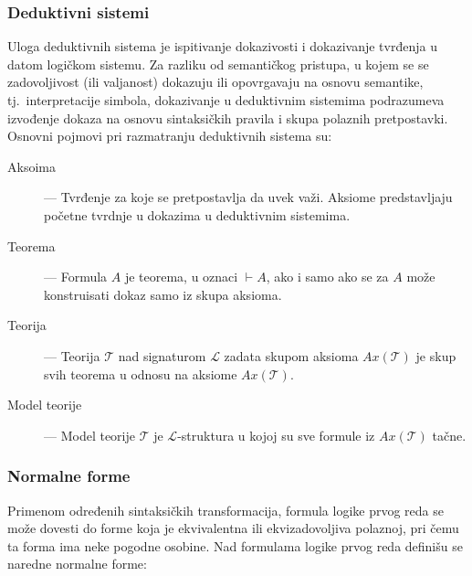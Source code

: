 \documentclass[a4paper,10pt]{article}
\begin{document}
\subsubsection{Deduktivni sistemi}

Uloga deduktivnih sistema je ispitivanje dokazivosti i dokazivanje tvrđenja u datom logičkom sistemu. Za razliku od semantičkog pristupa, u kojem se se zadovoljivost (ili valjanost) dokazuju ili opovrgavaju na osnovu semantike, tj.~interpretacije simbola, dokazivanje u deduktivnim sistemima podrazumeva izvođenje dokaza na osnovu sintaksičkih pravila i skupa polaznih pretpostavki. Osnovni pojmovi pri razmatranju deduktivnih sistema su:

\begin{description}
    \item[Aksoima] --- Tvrđenje za koje se pretpostavlja da uvek važi. Aksiome predstavljaju početne tvrdnje u dokazima u deduktivnim sistemima.
    \item[Teorema] --- Formula $A$ je teorema, u oznaci $\vdash A$, ako i samo ako se za $A$ može konstruisati dokaz samo iz skupa aksioma.
    \item[Teorija] --- Teorija $\mathcal{T}$ nad signaturom $\mathcal{L}$ zadata skupom aksioma $Ax(\mathcal{T})$ je skup svih teorema u odnosu na aksiome $Ax(\mathcal{T})$.
    \item[Model teorije] --- Model teorije $\mathcal{T}$ je $\mathcal{L}$-struktura u kojoj su sve formule iz $Ax(\mathcal{T})$ tačne.
\end{description}

\subsubsection{Normalne forme}

Primenom određenih sintaksičkih transformacija, formula logike prvog reda se može dovesti do forme koja je ekvivalentna ili ekvizadovoljiva polaznoj, pri čemu ta forma ima neke pogodne osobine. Nad formulama logike prvog reda definišu se naredne normalne forme:
\end{document}
